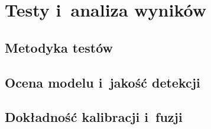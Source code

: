 \chapter{Testy i~analiza wyników}
\label{ch:testy}

\section{Metodyka testów}
\label{sec:metodyka}


\section{Ocena modelu i~jakość detekcji}
\label{sec:jakosc-detekcji}


\section{Dokładność kalibracji i~fuzji}
\label{sec:dokladnosc-kalibracji}


